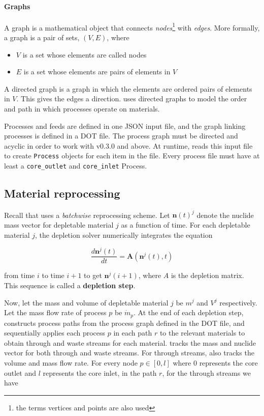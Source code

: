 \paragraph{Graphs}
    A graph is a mathematical object that connects {\it nodes}\footnote{the
    terms vertices and points are also used} with {\it edges}. More formally,
    a graph is a pair of sets, $(V, E)$, where
    \begin{itemize}
        \item $V$ is a set whose elements are called nodes
        \item $E$ is a set whose elements are pairs of elements in $V$
    \end{itemize}
    A directed graph is a graph in which the elements are ordered pairs of elements
    in $V$. This gives the edges a direction. \SaltProc uses directed graphs to
    model the order and path in which processes operate on materials.
        
Processes and feeds are defined in one JSON input file, and the graph linking
processes is defined in a DOT file. The process graph must be directed and
acyclic in order to work with \SaltProc v0.3.0 and above. At runtime,
\SaltProc reads this input file to create \verb.Process. objects for each item
in the file. Every process file must have at least a \verb.core_outlet. and
\verb.core_inlet. Process.

\subsection{Material reprocessing}
Recall that \SaltProc uses a {\it batchwise} reprocessing scheme.
Let $\mathbf{n}(t)^{j}$ denote the nuclide mass vector for depletable material
$j$ as a function of time. For each depletable material $j$, the depletion
solver numerically integrates the equation

\begin{equation}
    \frac{d\mathbf{n}^{j}(t)}{dt} = \mathbf{A}(\mathbf{n}^{j}(t), t)
\end{equation}

from time $i$ to time $i+1$ to get $\mathbf{n}^{j}(i+1)$, where $A$ is the
depletion matrix. This sequence is called a {\bf depletion step}.

Now, let the mass and volume of depletable material $j$ be
$m^{j}$ and $V^{j}$ respectively. Let the mass flow rate of process $p$ be
$\dot{m}_{p}$. At the end of each depletion step, \SaltProc constructs process
paths from the process graph defined in the DOT file, and sequentially applies
each process $p$ in each path $r$ to the relevant materials to obtain through
and waste streams for each material. \SaltProc tracks the mass and nuclide vector for both through and waste streams. For through
streams, \SaltProc also tracks the volume and mass flow rate. For every node
$p\in[0,l]$ where $0$ represents the core outlet and $l$ represents the core
inlet, in the path $r$, for the through streams we have

